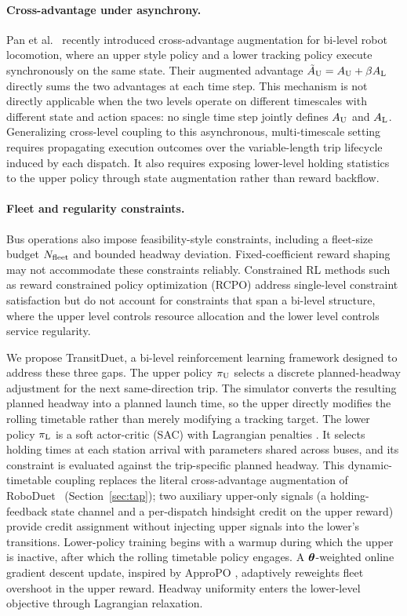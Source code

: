 \paragraph{Cross-advantage under asynchrony.}
Pan et al.~\citep{pan2024roboduet} recently introduced cross-advantage augmentation for bi-level robot locomotion, where an upper style policy and a lower tracking policy execute synchronously on the same state.
Their augmented advantage $\tilde{A}_{\mathrm{U}} = A_{\mathrm{U}} + \beta A_{\mathrm{L}}$ directly sums the two advantages at each time step.
This mechanism is not directly applicable when the two levels operate on different timescales with different state and action spaces: no single time step jointly defines $A_{\mathrm{U}}$ and $A_{\mathrm{L}}$.
Generalizing cross-level coupling to this asynchronous, multi-timescale setting requires propagating execution outcomes over the variable-length trip lifecycle induced by each dispatch.
It also requires exposing lower-level holding statistics to the upper policy through state augmentation rather than reward backflow.

\paragraph{Fleet and regularity constraints.}
Bus operations also impose feasibility-style constraints, including a fleet-size budget $N_{\mathrm{fleet}}$ and bounded headway deviation.
Fixed-coefficient reward shaping may not accommodate these constraints reliably.
Constrained RL methods such as reward constrained policy optimization (RCPO) \citep{tessler2019reward} address single-level constraint satisfaction but do not account for constraints that span a bi-level structure, where the upper level controls resource allocation and the lower level controls service regularity.

\medskip

We propose TransitDuet, a bi-level reinforcement learning framework designed to address these three gaps.
The upper policy $\pi_{\mathrm{U}}$ selects a discrete planned-headway adjustment for the next same-direction trip. The simulator converts the resulting planned headway into a planned launch time, so the upper directly modifies the rolling timetable rather than merely modifying a tracking target. The lower policy $\pi_{\mathrm{L}}$ is a soft actor-critic (SAC) with Lagrangian penalties \citep{haarnoja2018soft}. It selects holding times at each station arrival with parameters shared across buses, and its constraint is evaluated against the trip-specific planned headway.
This dynamic-timetable coupling replaces the literal cross-advantage augmentation of RoboDuet~\citep{pan2024roboduet} (Section~\ref{sec:tap}); two auxiliary upper-only signals (a holding-feedback state channel and a per-dispatch hindsight credit on the upper reward) provide credit assignment without injecting upper signals into the lower's transitions.
Lower-policy training begins with a warmup during which the upper is inactive, after which the rolling timetable policy engages.
A $\boldsymbol{\theta}$-weighted online gradient descent update, inspired by ApproPO \citep{miryoosefi2019reinforcement}, adaptively reweights fleet overshoot in the upper reward. Headway uniformity enters the lower-level objective through Lagrangian relaxation.

